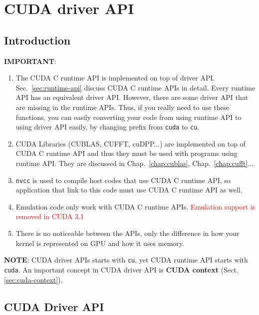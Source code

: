 
\chapter{CUDA driver API}
\label{chap:cuda-driver-api}

\section{Introduction}
\label{sec:intro_cuda_driverAPI}

{\bf IMPORTANT}: 
\begin{enumerate}
\item The CUDA C runtime API is implemented on top of driver
  API. Sec.~\ref{sec:runtime-api} discuss CUDA C runtime APIs in
  detail. Every runtime API has an equivalent driver API. However,
  there are some driver API that are missing in the runtime
  APIs. Thus, if you really need to use these functions, you can
  easily converting your code from using runtime API to using driver
  API easily, by changing prefix from \verb!cuda! to \verb!cu!.

\item CUDA Libraries (CUBLAS, CUFFT, cuDPP...) are implemented on top
  of CUDA C runtime API and thus they must be used with programs using
  runtime API. They are discussed in Chap.~\ref{chap:cublas},
  Chap.~\ref{chap:cufft}...

\item \verb!nvcc! is used to compile host codes that use CUDA C
  runtime API, so application that link to this code must use CUDA C
  runtime API as well.

\item Emulation code only work with CUDA C runtime APIs.
  \textcolor{red}{Emulation support is removed in CUDA 3.1}

\item There is no noticeable between the APIs, only the difference in
  how your kernel is represented on GPU and how it uses memory.
\end{enumerate}

{\bf NOTE}: CUDA driver APIs starts with \verb!cu!, yet CUDA runtime API starts
with \verb!cuda!. An important concept in CUDA driver API is {\bf CUDA context}
(Sect.\ref{sec:cuda-context}). 


\section{CUDA Driver API}
\label{sec:driver-api}

